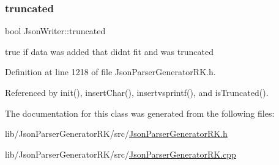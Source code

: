 \mbox{\label{class_json_writer_a30b9462bee5d300841630e64b660fe43}} 
\subsubsection{\texorpdfstring{truncated}{truncated}}
{\footnotesize\ttfamily bool Json\+Writer\+::truncated\hspace{0.3cm}{\ttfamily [protected]}}



true if data was added that didn\textquotesingle{}t fit and was truncated 



Definition at line 1218 of file Json\+Parser\+Generator\+R\+K.\+h.



Referenced by init(), insert\+Char(), insertvsprintf(), and is\+Truncated().



The documentation for this class was generated from the following files\+:\begin{DoxyCompactItemize}
\item 
lib/\+Json\+Parser\+Generator\+R\+K/src/\hyperlink{_json_parser_generator_r_k_8h}{Json\+Parser\+Generator\+R\+K.\+h}\item 
lib/\+Json\+Parser\+Generator\+R\+K/src/\hyperlink{_json_parser_generator_r_k_8cpp}{Json\+Parser\+Generator\+R\+K.\+cpp}\end{DoxyCompactItemize}
